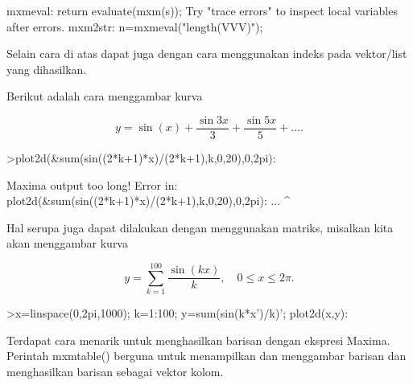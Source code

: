 \documentclass[a4paper,10pt]{article}
\begin{document}
\begin{eulernotebook}
\begin{eulercomment}
\begin{eulercomment}
\begin{eulercomment}
\begin{eulercomment}
\begin{eulercomment}
\begin{eulercomment}
\begin{euleroutput}
  mxmeval:
      return evaluate(mxm(s));
  Try "trace errors" to inspect local variables after errors.
  mxm2str:
      n=mxmeval("length(VVV)");
\end{euleroutput}
\begin{eulercomment}
Selain cara di atas dapat juga dengan cara menggunakan indeks pada vektor/list yang
dihasilkan.
\end{eulercomment}
\begin{eulercomment}
Berikut adalah cara menggambar kurva

\end{eulercomment}
\begin{eulerformula}
\[
y=\sin(x) + \dfrac{\sin 3x}{3} + \dfrac{\sin 5x}{5} + \ldots.
\]
\end{eulerformula}
\begin{eulerprompt}
>plot2d(&sum(sin((2*k+1)*x)/(2*k+1),k,0,20),0,2pi):
\end{eulerprompt}
\begin{euleroutput}
  
  Maxima output too long!
  Error in:
  plot2d(&sum(sin((2*k+1)*x)/(2*k+1),k,0,20),0,2pi): ...
                                            ^
\end{euleroutput}
\begin{eulercomment}
Hal serupa juga dapat dilakukan dengan menggunakan matriks, misalkan kita akan menggambar
kurva

\end{eulercomment}
\begin{eulerformula}
\[
y = \sum_{k=1}^{100} \dfrac{\sin(kx)}{k},\quad 0\le x\le 2\pi.
\]
\end{eulerformula}
\begin{eulercomment}
\end{eulercomment}
\begin{eulerprompt}
>x=linspace(0,2pi,1000); k=1:100; y=sum(sin(k*x')/k)'; plot2d(x,y):
\end{eulerprompt}
\begin{eulercomment}
Terdapat cara menarik untuk menghasilkan barisan dengan ekspresi Maxima. Perintah
mxmtable() berguna untuk menampilkan dan menggambar barisan dan menghasilkan barisan sebagai
vektor kolom. 


\end{eulercomment}
\end{eulercomment}
\end{eulercomment}
\end{eulercomment}
\end{eulercomment}
\end{eulercomment}
\end{eulercomment}
\end{eulernotebook}
\end{document}
